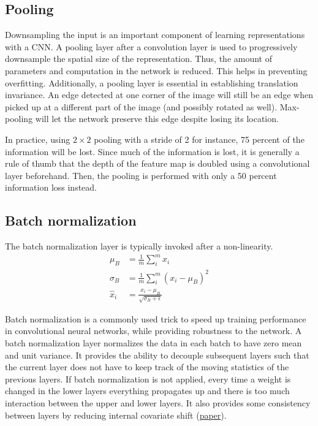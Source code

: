 \subsection{Pooling}
Downsampling the input is an important component of learning representations with a CNN.
A pooling layer after a convolution layer is used to progressively downsample the spatial size of the representation.
Thus, the amount of parameters and computation in the network is reduced.
This helps in preventing overfitting.
Additionally, a pooling layer is essential in establishing translation invariance.
An edge detected at one corner of the image will still be an edge when picked up at a different part of the image (and possibly rotated as well).
Max-pooling will let the network preserve this edge despite losing its location.

In practice, using $2\times 2$ pooling with a stride of 2 for instance, 75 percent of the information will be lost.
Since much of the information is lost, it is generally a rule of thumb that the depth of the feature map is doubled using a convolutional layer beforehand.
Then, the pooling is performed with only a 50 percent information loss instead.

\subsection{Batch normalization}
The batch normalization layer is typically invoked after a non-linearity.
$$
\begin{aligned}
\mu_B & =\frac{1}{m} \sum_{i}^m x_i\\
\sigma_B & = \frac{1}{m}\sum_i^m (x_i-\mu_B)^2\\
\hat{x}_i & = \frac{x_i -\mu_B}{\sqrt{\sigma_B +\epsilon}}
\end{aligned}
$$

Batch normalization is a commonly used trick to speed up training performance in convolutional neural networks, while providing robustness to the network.
A batch normalization layer normalizes the data in each batch to have zero mean and unit variance.
It provides the ability to decouple subsequent layers such that the current layer does not have to keep track of the moving statistics of the previous layers.
If batch normalization is not applied, every time a weight is changed in the lower layers everything propagates up and there is too much interaction between the upper and lower layers.
It also provides some consistency between layers by reducing internal covariate shift (\href{https://arxiv.org/abs/1502.03167}{paper}).

